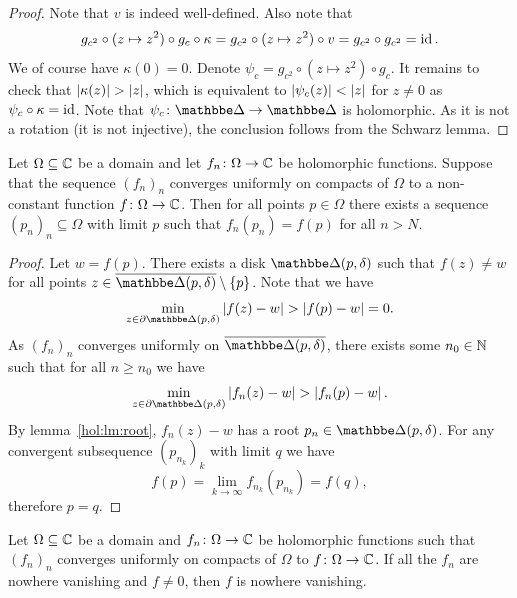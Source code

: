 \begin{proof}
Note that $v$ is indeed well-defined. Also note that
\[
g_{c^2} \circ (z \mapsto z^2) \circ g_c \circ \kappa =
g_{c^2} \circ (z \mapsto z^2) \circ v =
g_{c^2} \circ g_{c^2} =
\operatorname{id}.
\]
We of course have $\kappa(0) = 0$. Denote
$\psi_c = g_{c^2} \circ (z \mapsto z^2) \circ g_c$. It remains to
check that $\left\lvert \kappa(z)\right\rvert > \left\lvert z\right\rvert$, which is equivalent to
$\left\lvert \psi_c(z)\right\rvert < \left\lvert z\right\rvert$ for $z \ne 0$ as
$\psi_c \circ \kappa = \operatorname{id}$. Note that
$\psi_c \colon \dsk \to \dsk$ is holomorphic. As it is not a
rotation (it is not injective), the conclusion follows from the
Schwarz lemma.
\end{proof}

\begin{lema}[Hurwitz]
Let $\Omega \subseteq \mathbb{C}$ be a domain and let
$f_n \colon \Omega \to \mathbb{C}$ be holomorphic functions. Suppose that
the sequence $(f_n)_n$ converges uniformly on compacts of $\Omega$
to a non-constant function $f \colon \Omega \to \mathbb{C}$. Then for all
points $p \in \Omega$ there exists a sequence
$(p_n)_n \subseteq \Omega$ with limit $p$ such that
$f_n(p_n) = f(p)$ for all $n > N$.
\end{lema}

\begin{proof}
Let $w = f(p)$. There exists a disk $\dsk(p, \delta)$ such that
$f(z) \ne w$ for all points
$z \in \oline{\dsk(p, \delta)} \setminus \set{p}$. Note that we
have
\[
\min_{z \in \partial \dsk(p, \delta)} \abs{f(z) - w} >
\abs{f(p) - w} =
0.
\]
As $(f_n)_n$ converges uniformly on $\oline{\dsk(p, \delta)}$,
there exists some $n_0 \in \mathbb{N}$ such that for all $n \geq n_0$ we
have
\[
\min_{z \in \partial \dsk(p, \delta)} \abs{f_n(z) - w} >
\abs{f_n(p) - w}.
\]
By lemma~\ref{hol:lm:root}, $f_n(z) - w$ has a root
$p_n \in \dsk(p, \delta)$. For any convergent subsequence
$(p_{n_k})_k$ with limit $q$ we have
\[
f(p) = \lim_{k \to \infty} f_{n_k}(p_{n_k}) = f(q),
\]
therefore $p = q$.
\end{proof}

\begin{posledica}\label{thm_hol:cor:hurw}
Let $\Omega \subseteq \mathbb{C}$ be a domain and
$f_n \colon \Omega \to \mathbb{C}$ be holomorphic functions such that
$(f_n)_n$ converges uniformly on compacts of $\Omega$ to
$f \colon \Omega \to \mathbb{C}$. If all the $f_n$ are nowhere vanishing
and $f \ne 0$, then $f$ is nowhere vanishing.
\end{posledica}

\obvs

